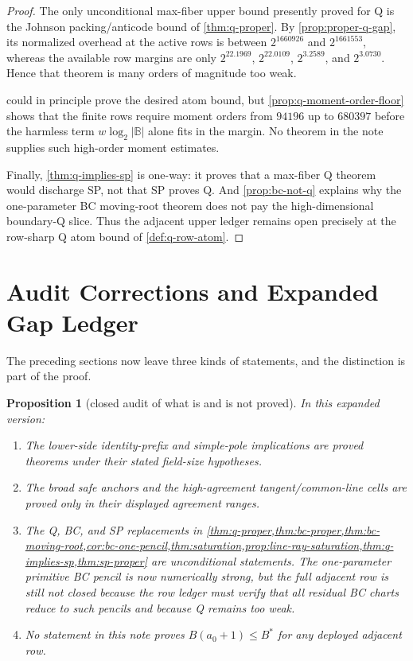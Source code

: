 \documentclass[a4paper,11pt]{amsart}
\newtheorem{proposition}[proposition]{Proposition}
\theoremstyle{remark}
\newcommand{\B}{\mathbb B}
\begin{document}
\begin{proof}
The only unconditional max-fiber upper bound presently proved for Q is the Johnson packing/anticode bound of \cref{thm:q-proper}.  By \cref{prop:proper-q-gap}, its normalized overhead at the active rows is between \(2^{1660926}\) and \(2^{1661553}\), whereas the available row margins are only \(2^{22.1969}\), \(2^{22.0109}\), \(2^{3.2589}\), and \(2^{3.0730}\).  Hence that theorem is many orders of magnitude too weak.

 could in principle prove the desired atom bound, but \cref{prop:q-moment-order-floor} shows that the finite rows require moment orders from \(94196\) up to \(680397\) before the harmless term \(w\log_2|\B|\) alone fits in the margin.  No theorem in the note supplies such high-order moment estimates.

Finally, \cref{thm:q-implies-sp} is one-way: it proves that a max-fiber Q theorem would discharge SP, not that SP proves Q.  And \cref{prop:bc-not-q} explains why the one-parameter BC moving-root theorem does not pay the high-dimensional boundary-Q slice.  Thus the adjacent upper ledger remains open precisely at the row-sharp Q atom bound of \cref{def:q-row-atom}.
\end{proof}

\section{Audit Corrections and Expanded Gap Ledger}

The preceding sections now leave three kinds of statements, and the distinction is part of the proof.

\begin{proposition}[closed audit of what is and is not proved]\label{prop:closed-audit}
In this expanded version:
\begin{enumerate}[label=\textup{(\roman*)}]
\item The lower-side identity-prefix and simple-pole implications are proved theorems under their stated field-size hypotheses.
\item The broad safe anchors and the high-agreement tangent/common-line cells are proved only in their displayed agreement ranges.
\item The Q, BC, and SP replacements in \cref{thm:q-proper,thm:bc-proper,thm:bc-moving-root,cor:bc-one-pencil,thm:saturation,prop:line-ray-saturation,thm:q-implies-sp,thm:sp-proper} are unconditional statements.  The one-parameter primitive BC pencil is now numerically strong, but the full adjacent row is still not closed because the row ledger must verify that all residual BC charts reduce to such pencils and because Q remains too weak.
\item No statement in this note proves \(B(a_0+1)\le B^*\) for any deployed adjacent row.
\end{enumerate}
\end{proposition}
\end{document}
